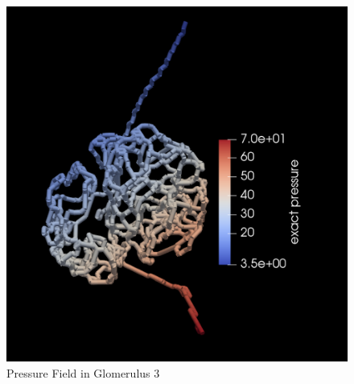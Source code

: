 \begin{figure}[h]
\centering
\includegraphics[width=162mm]{glom3_pressure2}
\caption{Pressure Field in Glomerulus 3}
\label{fig:glom3_pressure2}
\end{figure}
